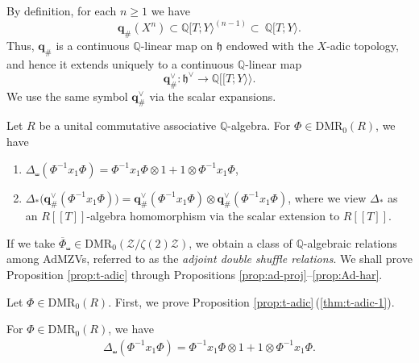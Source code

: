 \documentclass[15pt,oneside,reqno]{amsart}
\theoremstyle{remark}{
\newtheorem{lem}[df]{Lemma}
\newtheorem{prop}[df]{Proposition}
\newtheorem{ex}[df]{Example}
\newtheorem{rmk}[df]{Remark}
}
\newcommand{\ide}[1]{\mathfrak{#1}}
\newcommand{\Q}{\mathbb{Q}}
\newcommand{\DMR}{\mathrm{DMR}}
\begin{document}
By definition, for each $n\ge 1$ we have
\[
\mathbf{q}_{\#}(X^{n})
\subset
\Q[T;Y\rangle^{(n-1)}
\subset\ \Q[T; Y\rangle .
\]
Thus, $\mathbf{q}_{\#}$ is a continuous $\Q$-linear map on $\ide{h}$ endowed with the $X$-adic topology,
and hence it extends uniquely to a continuous $\Q$-linear map
\[
\mathbf{q}_{\#}^{\vee}\colon \ide{h}^{\vee}\longrightarrow \Q[[T;Y \rangle\rangle .
\]
We use the same symbol $\mathbf{q}_{\#}^{\vee}$ via the scalar expansions.







\begin{prop}\label{prop:t-adic}
Let $R$ be a unital commutative associative $\Q$-algebra. For $\Phi \in \DMR_0(R)$, we have
\begin{enumerate}
\item\label{thm:t-adic-1} $\Delta_{\shuffle}(\Phi^{-1} x_1 \Phi)=\Phi^{-1} x_1 \Phi \otimes 1 + 1\otimes \Phi^{-1} x_1 \Phi$,
\item\label{thm:t-adic-2} $\Delta_{*}\bigl(\mathbf{q}_{\#}^{\vee}(\Phi^{-1} x_1 \Phi)\bigr)
=\mathbf{q}_{\#}^{\vee}(\Phi^{-1} x_1 \Phi)\otimes \mathbf{q}_{\#}^{\vee}(\Phi^{-1} x_1 \Phi)$,
where we view $\Delta_*$ as an $R[[T]]$-algebra homomorphism via the scalar extension to $R[[T]]$.
\end{enumerate}
\end{prop}

If we take $\overline{\Phi}_{\shuffle} \in \DMR_0(\mathcal{Z}/\zeta(2)\mathcal{Z})$, we obtain a class of $\Q$-algebraic relations among AdMZVs, referred to as the \emph{adjoint double shuffle relations}.
We shall prove Proposition \ref{prop:t-adic} through Propositions \ref{prop:ad-proj}--\ref{prop:Ad-har}.

Let $\Phi \in \DMR_0(R)$.
First, we prove Proposition \ref{prop:t-adic}\,(\ref{thm:t-adic-1}).

\begin{prop}[{ = Proposition \ref{prop:t-adic} (\ref{thm:t-adic-1}})]
For  $\Phi \in \DMR_0(R)$, we have
\begin{align}
\Delta_{\shuffle}(\Phi^{-1}x_1\Phi ) = \Phi^{-1}x_1\Phi  \otimes 1 + 1\otimes \Phi^{-1}x_1\Phi. \label{eq:ad-shuffle}
\end{align}


\end{prop}
\end{document}
